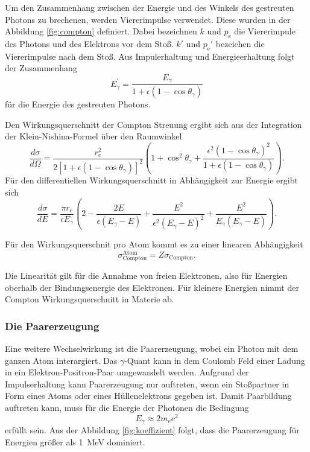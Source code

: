 Um den Zusammenhang zwischen der Energie und des Winkels des gestreuten Photons
zu brechenen, werden Viererimpulse verwendet. Diese wurden in der Abbildung \ref{fig:compton} definiert.
Dabei bezeichnen $k$ und $p_{\text{e}}$ die Viererimpule des Photons und des Elektrons vor dem Stoß.
$k'$ und $p_{\text{e}}'$ bezeichen die Viererimpulse nach dem Stoß.
Aus Impulerhaltung und Energieerhaltung folgt der Zusammenhang
\begin{equation}
    E_\gamma^{\prime}=\frac{E_\gamma}{1+\epsilon\left(1-\cos \theta_\gamma\right)}
    \label{eqn:Energie_comptonstreuung}
\end{equation}
für die Energie des gestreuten Photons.

Den Wirkungsquerschnitt der Compton Streuung ergibt sich aus der Integration der Klein-Nishina-Formel über den Raumwinkel
\begin{equation}
    \frac{d \sigma}{d \Omega}=\frac{r_e^2}{2\left[1+\epsilon\left(1-\cos \theta_\gamma\right)\right]^2}\left(1+\cos ^2 \theta_\gamma+\frac{\epsilon^2\left(1-\cos \theta_\gamma\right)^2}{1+\epsilon\left(1-\cos \theta_\gamma\right)}\right).
\end{equation}
Für den differentiellen Wirkungsquerschnitt in Abhängigkeit zur Energie ergibt sich 
\begin{equation}
    \frac{d \sigma}{d E} = \frac{\pi r_{\text{e}}}{\epsilon E_\gamma} \left(2 - \frac{2 E}{\epsilon \left(E_\gamma - E \right)}+ \frac{E^2}{\epsilon^2 \left(E_\gamma - E \right)^2} + \frac{E^2}{E_\gamma \left(E_\gamma - E \right)}\right).
\end{equation}

Für den Wirkungsquerschnit pro Atom kommt es zu einer linearen Abhängigkeit
\begin{equation}
    \sigma_{\text{Compton}}^{\text{Atom}}=Z \sigma_{\text{Compton}}.
\end{equation}

Die Linearität gilt für die Annahme von freien Elektronen, also für Energien oberhalb der
Bindungsenergie des Elektronen.
Für kleinere Energien nimmt der Compton Wirkungsquerschnitt in Materie ab.

\subsubsection{Die Paarerzeugung}
\label{paarerzeugung}

Eine weitere Wechselwirkung ist die Paarerzeugung, wobei ein Photon mit dem ganzen Atom interargiert.
Das $\gamma$-Quant kann in dem Coulomb Feld einer Ladung in ein Elektron-Positron-Paar umgewandelt werden.
Aufgrund der Impulserhaltung kann Paarerzeugung nur auftreten, wenn ein Stoßpartner in Form eines Atoms oder eines Hüllenelektrons
gegeben ist.
Damit Paarbildung auftreten kann, muss für die Energie der Photonen die Bedingung 
\begin{equation}
    E_\gamma \approx 2 m_e c^2
\end{equation}
erfüllt sein. 
Aus der Abbildung \ref{fig:koeffizient} folgt, dass die Paarerzeugung für Energien größer als \qty{1}{\mega\eV} dominiert.

